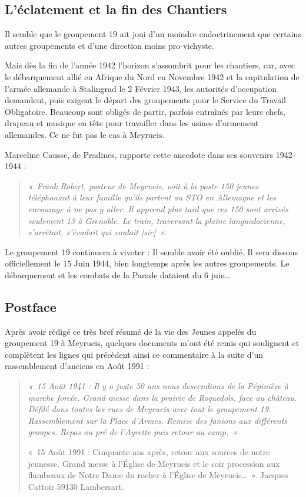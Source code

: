 \newpage


\subsection{L’éclatement et la fin des Chantiers}

Il semble que le groupement 19 ait joui d’un moindre endoctrinement que certains
autres groupements et d’une direction moins pro-vichyste.

Mais dès la fin de l’année 1942 l’horizon s’assombrit pour les chantiers, car, avec le
débarquement allié en Afrique du Nord en Novembre 1942 et la capitulation de
l’armée allemande à Stalingrad le 2 Février 1943, les autorités d’occupation
demandent, puis exigent le départ des groupements pour le Service du Travail
Obligatoire. Beaucoup sont obligés de partir, parfois entraînés par leurs chefs,
drapeau et musique en tête pour travailler dans les usines d’armement allemandes. Ce
ne fut pas le cas à Meyrueis.

Marceline Causse, de Pradines, rapporte cette anecdote dans ses souvenirs 1942-1944 :

\begin{quote}\itshape
«~Frank Robert, pasteur de Meyrueis, voit à la poste 150 jeunes téléphonant à leur famille qu’ils
partent au STO en Allemagne et les encourage à ne pas y aller. Il apprend plus tard que ces 150 sont
arrivés seulement 13 à Grenoble. Le train, traversant la plaine languedocienne, s’arrêtait, s’évadait
qui voulait \textit{[sic]}~».
\end{quote}

Le groupement 19 continuera à vivoter : Il semble avoir été oublié. Il sera dissous
officiellement le 15 Juin 1944, bien longtemps après les autres groupements. Le
débarquement et les combats de la Parade dataient du 6 juin…

\subsection{Postface}

Après avoir rédigé ce très bref résumé de la vie des Jeunes appelés du groupement 19
à Meyrueis, quelques documents m’ont été remis qui soulignent et complètent les
lignes qui précèdent ainsi ce commentaire à la suite d’un rassemblement d’anciens
en Août 1991 :

\begin{quote}\itshape
«~15 Août 1941 : Il y a juste 50 ans nous descendions de la Pépinière à marche
forcée. Grand messe dans la prairie de Roquedols, face au château. Défilé dans
toutes les rues de Meyrueis avec tout le groupement 19. Rassemblement sur la Place
d’Armes. Remise des fanions aux différents groupes. Repas au pré de l’Ayrette puis
retour au camp.~»

«~15 Août 1991 : Cinquante ans après, retour aux sources de notre jeunesse. Grand
messe à l’Église de Meyrueis et le soir procession aux flambeaux de Notre Dame du
rocher à l’Église de Meyrueis…~». Jacques Cattoir 59130 Lambersart.
\end{quote}

